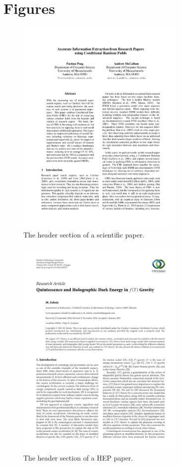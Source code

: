 
\chapter{Figures} %

\label{AppendixB} %


\begin{figure}[!ht]
\center
\includegraphics[width=3.25in]{Figures/header1.pdf}
\caption{The header section of a scientific paper.}
\label{fig:header1}
\end{figure}

\begin{figure}[!ht]
\center
\includegraphics[width=3.25in]{Figures/header2.pdf}
\caption{The header section of a HEP paper.}
\label{fig:header2}
\end{figure}
